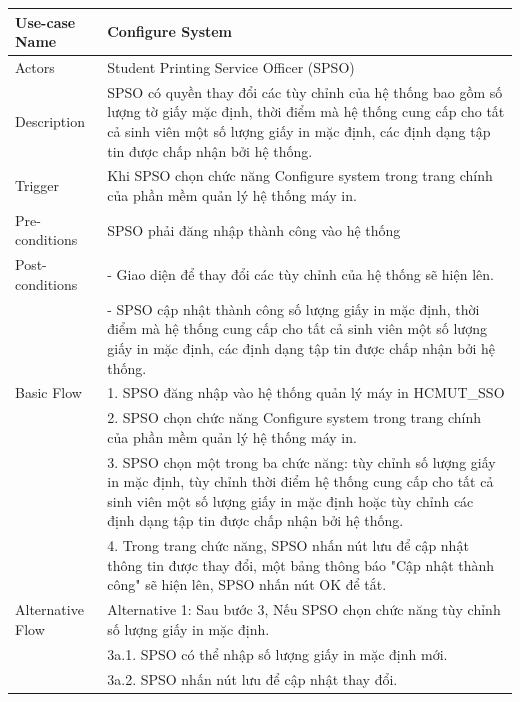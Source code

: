 \begin{enumerate}[a)]
    \begin{longtable}{|l|p{10cm}|}
        \hline
        \endhead
        \hline
        \endfoot
        Use-case Name & \textbf{Configure System}\\
        \hline
        Actors & Student Printing Service Officer (SPSO)\\
        \hline
        Description & SPSO có quyền thay đổi các tùy chỉnh của hệ thống bao gồm số lượng tờ giấy mặc định, thời điểm mà hệ thống cung cấp cho tất cả sinh viên một số lượng giấy in mặc định, các định dạng tập tin được chấp nhận bởi hệ thống.\\
        \hline
        Trigger & Khi SPSO chọn chức năng Configure system trong trang chính của phần mềm quản lý hệ thống máy in.\\
        \hline
        Pre-conditions & SPSO phải đăng nhập thành công vào hệ thống\\
        \hline
        Post-conditions & - Giao diện để thay đổi các tùy chỉnh của hệ thống sẽ hiện lên.\\
        & - SPSO cập nhật thành công số lượng giấy in mặc định, thời điểm mà hệ thống cung cấp cho tất cả sinh viên một số lượng giấy in mặc định, các định dạng tập tin được chấp nhận bởi hệ thống.\\
        \hline
        Basic Flow & 1. SPSO đăng nhập vào hệ thống quản lý máy in HCMUT\_SSO\\
        & 2. SPSO chọn chức năng Configure system trong trang chính của phần mềm quản lý hệ thống máy in.\\
        & 3. SPSO chọn một trong ba chức năng: tùy chỉnh số lượng giấy in mặc định, tùy chỉnh thời điểm hệ thống cung cấp cho tất cả sinh viên một số lượng giấy in mặc định hoặc tùy chỉnh các định dạng tập tin được chấp nhận bởi hệ thống.\\
        & 4. Trong trang chức năng, SPSO nhấn nút lưu để cập nhật thông tin được thay đổi, một bảng thông báo "Cập nhật thành công" sẽ hiện lên, SPSO nhấn nút OK để tắt.\\
        \hline
        Alternative Flow & Alternative 1: Sau bước 3, Nếu SPSO chọn chức năng tùy chỉnh số lượng giấy in mặc định.\\
        & \hspace{1em} 3a.1. SPSO có thể nhập số lượng giấy in mặc định mới. \\
        & \hspace{1em} 3a.2. SPSO nhấn nút lưu để cập nhật thay đổi.\\
        

\end{longtable}
\end{enumerate}
